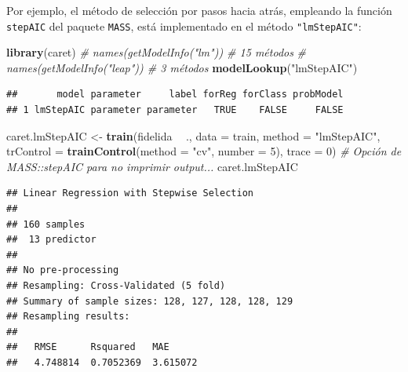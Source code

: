 \documentclass[
  spanish,
]{book}
\newenvironment{Shaded}{\begin{snugshade}}{\end{snugshade}}
\newcommand{\CommentTok}[1]{\textcolor[rgb]{0.56,0.35,0.01}{\textit{#1}}}
\newcommand{\DataTypeTok}[1]{\textcolor[rgb]{0.13,0.29,0.53}{#1}}
\newcommand{\DecValTok}[1]{\textcolor[rgb]{0.00,0.00,0.81}{#1}}
\newcommand{\KeywordTok}[1]{\textcolor[rgb]{0.13,0.29,0.53}{\textbf{#1}}}
\newcommand{\NormalTok}[1]{#1}
\newcommand{\OperatorTok}[1]{\textcolor[rgb]{0.81,0.36,0.00}{\textbf{#1}}}
\newcommand{\StringTok}[1]{\textcolor[rgb]{0.31,0.60,0.02}{#1}}
\theoremstyle{break}
\theoremstyle{definition}
\theoremstyle{definition}
\theoremstyle{definition}
\theoremstyle{remark}
\begin{document}
Por ejemplo, el método de selección por pasos hacia atrás, empleando la función \texttt{stepAIC} del paquete \texttt{MASS}, está implementado en el método \texttt{"lmStepAIC"}:

\begin{Shaded}
\begin{Highlighting}[]
\KeywordTok{library}\NormalTok{(caret)}
\CommentTok{# names(getModelInfo("lm")) # 15 métodos}
\CommentTok{# names(getModelInfo("leap")) # 3 métodos}
\KeywordTok{modelLookup}\NormalTok{(}\StringTok{"lmStepAIC"}\NormalTok{) }
\end{Highlighting}
\end{Shaded}

\begin{verbatim}
##       model parameter     label forReg forClass probModel
## 1 lmStepAIC parameter parameter   TRUE    FALSE     FALSE
\end{verbatim}

\begin{Shaded}
\begin{Highlighting}[]
\NormalTok{caret.lmStepAIC <-}\StringTok{ }\KeywordTok{train}\NormalTok{(fidelida }\OperatorTok{~}\StringTok{ }\NormalTok{., }\DataTypeTok{data =}\NormalTok{ train, }\DataTypeTok{method =} \StringTok{"lmStepAIC"}\NormalTok{,}
                   \DataTypeTok{trControl =} \KeywordTok{trainControl}\NormalTok{(}\DataTypeTok{method =} \StringTok{"cv"}\NormalTok{, }\DataTypeTok{number =} \DecValTok{5}\NormalTok{),}
                   \DataTypeTok{trace =} \DecValTok{0}\NormalTok{) }\CommentTok{# Opción de MASS::stepAIC para no imprimir output...}
\NormalTok{caret.lmStepAIC}
\end{Highlighting}
\end{Shaded}

\begin{verbatim}
## Linear Regression with Stepwise Selection 
## 
## 160 samples
##  13 predictor
## 
## No pre-processing
## Resampling: Cross-Validated (5 fold) 
## Summary of sample sizes: 128, 127, 128, 128, 129 
## Resampling results:
## 
##   RMSE      Rsquared   MAE     
##   4.748814  0.7052369  3.615072
\end{verbatim}

\begin{Shaded}
\end{Shaded}
\end{document}
